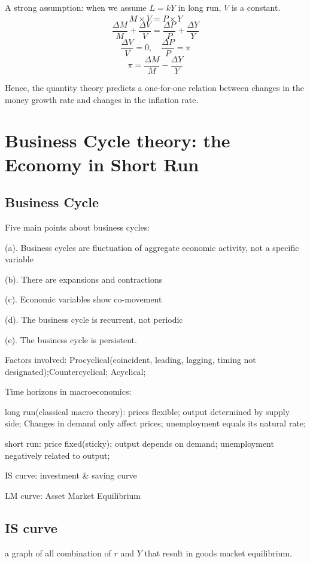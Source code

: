 \documentclass[10pt, a4paper]{article}
\begin{document}
        A strong assumption: when we assume $L = kY$ in long run, $V$ is a constant. 
        $$M \times \overline{V} = P \times Y$$
        $$\frac{\Delta M}{M} + \frac{\Delta V}{V} = \frac{\Delta P}{P} + \frac{\Delta Y}{Y}$$
        $$\frac{\Delta V}{V} = 0, \quad \frac{\Delta P}{P} = \pi$$
        $$\pi = \frac{\Delta M}{M} - \frac{\Delta Y}{Y}$$

        Hence, the quantity theory predicts a one-for-one relation between changes in the money growth rate and changes in the inflation rate. 
\newpage
\section{Business Cycle theory: the Economy in Short Run}
    \subsection{Business Cycle}
        Five main points about business cycles: 

        \quad (a). Business cycles are fluctuation of aggregate economic activity, not a specific variable 

        \quad (b). There are expansions and contractions 

        \quad (c). Economic variables show co-movement

        \quad (d). The business cycle is recurrent, not periodic

        \quad (e). The business cycle is persistent. 
    

        Factors involved: Procyclical(coincident, leading, lagging, timing not designated);Countercyclical; Acyclical; 
            
        Time horizons in macroeconomics: 
        
        \quad long run(classical macro theory): prices flexible; output determined by supply side; Changes in demand only affect prices; unemployment equals its natural rate; 

        \quad short run: price fixed(sticky); output depends on demand; unemployment negatively related to output; 

        \medskip

        IS curve: investment \& saving curve 

        LM curve: Asset Market Equilibrium

        \subsection{IS curve}
            a graph of all combination of $r$ and $Y$ that result in goods market equilibrium.
\end{document}
